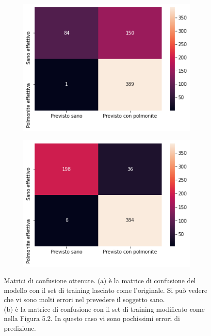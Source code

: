  \begin{figure}[H]
        \begin{subfigure}{0.55\textwidth}
          \centering
          \includegraphics[width=0.95\linewidth]{Figures/conf-matrix-no-aug.png}
          \caption{}
          \label{fig:snap1}
        \end{subfigure}%
        \begin{subfigure}{0.55\textwidth}
          \centering
          \includegraphics[width=.95\linewidth]{Figures/conf-matrix-pneumonia-aug.png}
          \caption{}
          \label{fig:snap2}
        \end{subfigure}%
        \caption{ Matrici di confusione ottenute. (a) è la matrice di confusione del modello con il set di
         training lasciato come l'originale. 
        Si può vedere che vi sono molti errori nel prevedere il soggetto sano. \\
        (b) è la matrice di confusione con il set di training modificato come nella Figura 5.2. 
        In questo caso vi sono pochissimi errori di predizione.
        }
        \label{fig:fig}
\end{figure} 


